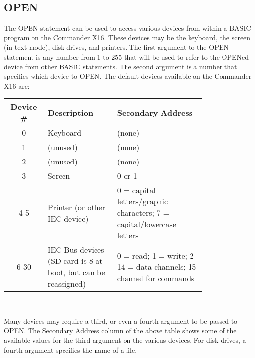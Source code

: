 
\subsection{OPEN}

The {\ttfamily OPEN} statement can be used to access various devices from
within a BASIC program on the Commander X16.  These devices may be the
keyboard, the screen (in text mode), disk drives, and printers.  The first
argument to the {\ttfamily OPEN} statement is any number from 1 to 255 that
will be used to refer to the {\ttfamily OPEN}ed device from other BASIC
statements.  The second argument is a number that specifies which device to
{\ttfamily OPEN}.  The default devices available on the Commander X16 are:\\

\begin{tabular}{|c|p{0.35\linewidth}|p{0.45\linewidth}|}
	\hline
	{\bfseries Device \#} & {\bfseries Description} & {\bfseries Secondary Address}\\ \hline

	0 & Keyboard & (none)\\ \hline

	1 & (unused) & (none)\\ \hline

	2 & (unused) & (none)\\ \hline

	3 & Screen & 0 or 1\\ \hline

	4-5 & Printer (or other IEC device) & 0 = capital letters/graphic characters; 7 = capital/lowercase letters\\ \hline

	6-30 & IEC Bus devices (SD card is 8 at boot, but can be reassigned) & 0 = read; 1 = write; 2-14
	= data channels; 15 channel for commands\\ \hline

\end{tabular}\\

\vspace{16pt}

Many devices may require a third, or even a fourth argument to be passed to
{\ttfamily OPEN}.  The Secondary Address column of the above table shows some
of the available values for the third argument on the various devices.  For
disk drives, a fourth argument specifies the name of a file.\\



